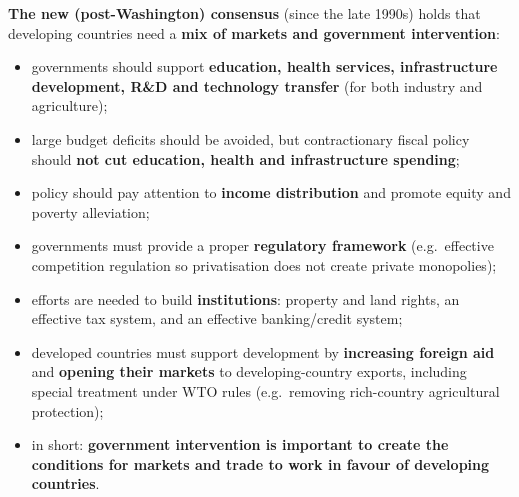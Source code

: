 \textbf{The new (post-Washington) consensus} (since the late 1990s) holds that developing countries need a \textbf{mix of markets and government intervention}:
\begin{itemize}
  \item governments should support \textbf{education, health services, infrastructure development, R\&D and technology transfer} (for both industry and agriculture);
  \item large budget deficits should be avoided, but contractionary fiscal policy should \textbf{not cut education, health and infrastructure spending};
  \item policy should pay attention to \textbf{income distribution} and promote equity and poverty alleviation;
  \item governments must provide a proper \textbf{regulatory framework} (e.g.\ effective competition regulation so privatisation does not create private monopolies);
  \item efforts are needed to build \textbf{institutions}: property and land rights, an effective tax system, and an effective banking/credit system;
  \item developed countries must support development by \textbf{increasing foreign aid} and \textbf{opening their markets} to developing-country exports, including special treatment under WTO rules (e.g.\ removing rich-country agricultural protection);
  \item in short: \textbf{government intervention is important to create the conditions for markets and trade to work in favour of developing countries}.
\end{itemize}

